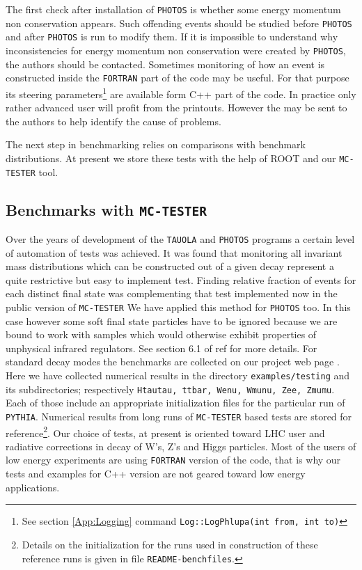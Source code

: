 \documentclass[]{Photos_interface_design}
\begin{document}
The first check after installation of {\tt PHOTOS} is whether some energy momentum non 
conservation appears. Such offending events should be studied
before {\tt PHOTOS}  and after {\tt PHOTOS} is run to modify them.
If it is impossible to understand why inconsistencies for energy momentum non 
conservation were created by {\tt PHOTOS}, the authors should be contacted. Sometimes
monitoring of how an event is constructed inside the {\tt FORTRAN} part of the code
may be useful. For that purpose its steering parameters\footnote{See section \ref{App:Logging}
command {\tt Log::LogPhlupa(int from, int to)}}
 are
available form C++ part of the code. In practice only rather
 advanced user will profit from the printouts. However the may be sent to
the authors to help identify  the cause of problems.


The next step in benchmarking relies on comparisons with benchmark distributions. 
At present we store these tests with the help of ROOT \cite{Antcheva:2009zz} and our {\tt MC-TESTER} tool.



\subsection{Benchmarks with {\tt MC-TESTER}}



Over the years of development of the {\tt TAUOLA} and {\tt PHOTOS} programs a certain level 
of automation of tests was achieved. It was found that monitoring all invariant mass distributions which can be constructed out of a given decay represent 
a quite restrictive but easy to implement test.
Finding  relative fraction of events for each distinct final state 
 was complementing that test implemented now in the public version of {\tt MC-TESTER} 
We have applied this method 
for {\tt PHOTOS} too. In this case however some soft final state particles have to be ignored because we are bound to  work with  samples which would otherwise
exhibit properties of unphysical infrared regulators. See section 6.1 of 
ref \cite{Davidson:2008ma} for more details. For standard decay modes the benchmarks are collected on our project web page \cite{Photos_tests}.
Here we have collected numerical results in the directory
{\tt examples/testing} and its subdirectories; respectively  
{\tt Htautau, ttbar, Wenu, Wmunu, Zee, Zmumu}. Each of those include
an appropriate initialization files for the particular run of {\tt PYTHIA}. Numerical results from long runs of {\tt MC-TESTER} based tests
are stored for reference\footnote{Details on the initialization for the 
runs used in construction of these reference runs is given in file
{\tt README-benchfiles}.}. Our choice of tests, at present is oriented toward 
LHC user and radiative corrections in decay of W's, Z's and Higgs particles.
Most of the users of low energy experiments are using {\tt FORTRAN} version 
of the code, that is why our tests and examples for C++ version are not geared toward 
low energy applications.
\end{document}
